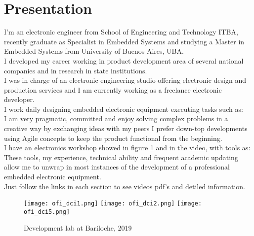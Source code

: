 \section{Presentation}
I'm an electronic engineer from School of Engineering and Technology ITBA,
recently graduate as Specialist in Embedded Systems and studying a
Master in Embedded Systems from University of Buenos Aires, UBA.\\
I developed my career working in product development area of several
national companies and in research in state institutions.\\
I was in charge of an electronic engineering studio offering electronic design
and production services and I am currently working as a freelance electronic
developer. \\ %
I work daily designing embedded electronic equipment executing tasks such as: \\
I am very pragmatic, committed and enjoy solving complex problems in a creative way by exchanging ideas
with my peers I prefer down-top developments using Agile concepts to keep the product functional from
the beginning.\\
I have an electronics workshop showed in figure \ref{fig:ofi_dci} and in the \href{\linkofidci}{video}, with tools as:\\
These tools, my experience, technical ability and frequent academic updating allow me to unwrap
in most instances of the development of a professional embedded electronic equipment.\\
Just follow the links in each section to see videos pdf's and detiled information.\\
  \begin{figure}
      \begin{center}
         \texttt{[image: ofi\_dci1.png]}
         \texttt{[image: ofi\_dci2.png]}
         \texttt{[image: ofi\_dci5.png]}
      \end{center}
      \caption{Development lab at Bariloche, 2019}
      \label{fig:ofi_dci}
   \end{figure}
